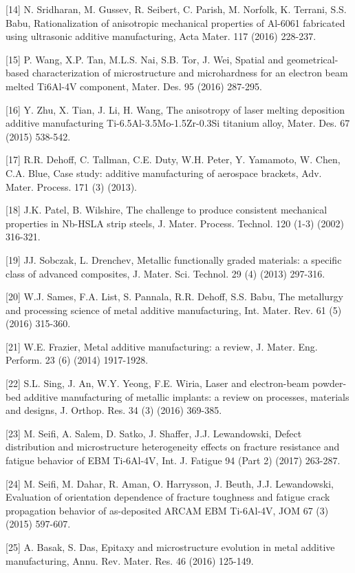 \documentclass[10pt]{article}
\begin{document}
[14] N. Sridharan, M. Gussev, R. Seibert, C. Parish, M. Norfolk, K. Terrani, S.S. Babu, Rationalization of anisotropic mechanical properties of Al-6061 fabricated using ultrasonic additive manufacturing, Acta Mater. 117 (2016) 228-237.

[15] P. Wang, X.P. Tan, M.L.S. Nai, S.B. Tor, J. Wei, Spatial and geometrical-based characterization of microstructure and microhardness for an electron beam melted Ti6Al-4V component, Mater. Des. 95 (2016) 287-295.

[16] Y. Zhu, X. Tian, J. Li, H. Wang, The anisotropy of laser melting deposition additive manufacturing Ti-6.5Al-3.5Mo-1.5Zr-0.3Si titanium alloy, Mater. Des. 67 (2015) 538-542.

[17] R.R. Dehoff, C. Tallman, C.E. Duty, W.H. Peter, Y. Yamamoto, W. Chen, C.A. Blue, Case study: additive manufacturing of aerospace brackets, Adv. Mater. Process. 171 (3) (2013).

[18] J.K. Patel, B. Wilshire, The challenge to produce consistent mechanical properties in Nb-HSLA strip steels, J. Mater. Process. Technol. 120 (1-3) (2002) 316-321.

[19] JJ. Sobczak, L. Drenchev, Metallic functionally graded materials: a specific class of advanced composites, J. Mater. Sci. Technol. 29 (4) (2013) 297-316.

[20] W.J. Sames, F.A. List, S. Pannala, R.R. Dehoff, S.S. Babu, The metallurgy and processing science of metal additive manufacturing, Int. Mater. Rev. 61 (5) (2016) 315-360.

[21] W.E. Frazier, Metal additive manufacturing: a review, J. Mater. Eng. Perform. 23 (6) (2014) 1917-1928.

[22] S.L. Sing, J. An, W.Y. Yeong, F.E. Wiria, Laser and electron-beam powder-bed additive manufacturing of metallic implants: a review on processes, materials and designs, J. Orthop. Res. 34 (3) (2016) 369-385.

[23] M. Seifi, A. Salem, D. Satko, J. Shaffer, J.J. Lewandowski, Defect distribution and microstructure heterogeneity effects on fracture resistance and fatigue behavior of EBM Ti-6Al-4V, Int. J. Fatigue 94 (Part 2) (2017) 263-287.

[24] M. Seifi, M. Dahar, R. Aman, O. Harrysson, J. Beuth, J.J. Lewandowski, Evaluation of orientation dependence of fracture toughness and fatigue crack propagation behavior of as-deposited ARCAM EBM Ti-6Al-4V, JOM 67 (3) (2015) 597-607.

[25] A. Basak, S. Das, Epitaxy and microstructure evolution in metal additive manufacturing, Annu. Rev. Mater. Res. 46 (2016) 125-149.
\end{document}
